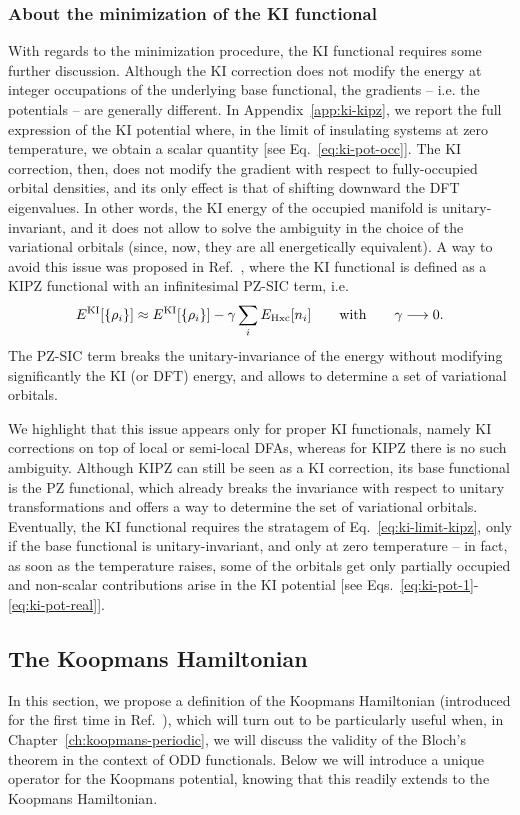 \subsubsection*{About the minimization of the KI functional}
With regards to the minimization procedure, the KI functional requires some further discussion. Although the KI correction does not modify the energy at integer occupations of the underlying base functional, the gradients -- i.e. the potentials -- are generally different. In Appendix~\ref{app:ki-kipz}, we report the full expression of the KI potential where, in the limit of insulating systems at zero temperature, we obtain a scalar quantity [see Eq.~\eqref{eq:ki-pot-occ}]. The KI correction, then, does not modify the gradient with respect to fully-occupied orbital densities, and its only effect is that of shifting downward the DFT eigenvalues. In other words, the KI energy of the occupied manifold is unitary-invariant, and it does not allow to solve the ambiguity in the choice of the variational orbitals (since, now, they are all energetically equivalent). A way to avoid this issue was proposed in Ref.~\cite{borghi_koopmans-compliant_2014}, where the KI functional is defined as a KIPZ functional with an infinitesimal PZ-SIC term, i.e.
%
\begin{equation}
    E^{\rm KI}[\{ \rho_i \}] \approx E^{\rm KI}[\{ \rho_i \}] - \gamma \sum_i E_{\rm Hxc}[n_i]
    \qquad \text{with} \qquad \gamma \longrightarrow 0 .
    \label{eq:ki-limit-kipz}
\end{equation}
%
The PZ-SIC term breaks the unitary-invariance of the energy without modifying significantly the KI (or DFT) energy, and allows to determine a set of variational orbitals.

We highlight that this issue appears only for proper KI functionals, namely KI corrections on top of local or semi-local DFAs, whereas for KIPZ there is no such ambiguity. Although KIPZ can still be seen as a KI correction, its base functional is the PZ functional, which already breaks the invariance with respect to unitary transformations and offers a way to determine the set of variational orbitals. Eventually, the KI functional requires the stratagem of Eq.~\eqref{eq:ki-limit-kipz}, only if the base functional is unitary-invariant, and only at zero temperature -- in fact, as soon as the temperature raises, some of the orbitals get only partially occupied and non-scalar contributions arise in the KI potential [see Eqs.~\eqref{eq:ki-pot-1}-\eqref{eq:ki-pot-real}].

\subsection{The Koopmans Hamiltonian\label{sec:koopmans-hamiltonian}}
In this section, we propose a definition of the Koopmans Hamiltonian (introduced for the first time in Ref.~\cite{de_gennaro_blochs_2022}), which will turn out to be particularly useful when, in Chapter~\ref{ch:koopmans-periodic}, we will discuss the validity of the Bloch's theorem in the context of ODD functionals. Below we will introduce a unique operator for the Koopmans potential, knowing that this readily extends to the Koopmans Hamiltonian.


